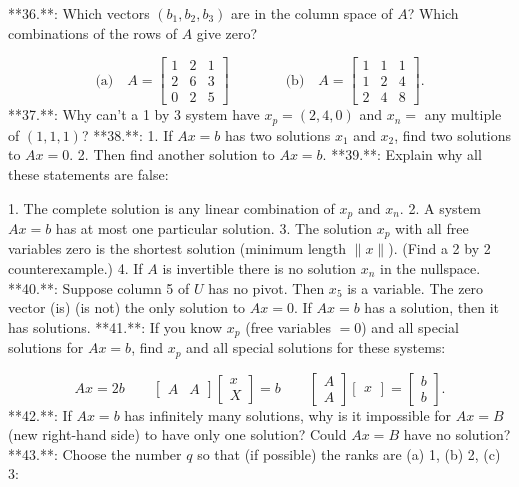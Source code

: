 

**36.**: Which vectors \((b_{1},b_{2},b_{3})\) are in the column space of \(A\)? Which combinations of the rows of \(A\) give zero?

\[\text{(a)}\quad A=\begin{bmatrix}1&2&1\\ 2&6&3\\ 0&2&5\end{bmatrix}\qquad\qquad\text{(b)}\quad A=\begin{bmatrix}1&1&1\\ 1&2&4\\ 2&4&8\end{bmatrix}.\]
**37.**: Why can't a 1 by 3 system have \(x_{p}=(2,4,0)\) and \(x_{n}=\) any multiple of \((1,1,1)\)?
**38.**: 1. If \(Ax=b\) has two solutions \(x_{1}\) and \(x_{2}\), find two solutions to \(Ax=0\). 2. Then find another solution to \(Ax=b\).
**39.**: Explain why all these statements are false:

1. The complete solution is any linear combination of \(x_{p}\) and \(x_{n}\). 2. A system \(Ax=b\) has at most one particular solution. 3. The solution \(x_{p}\) with all free variables zero is the shortest solution (minimum length \(\|x\|\)). (Find a 2 by 2 counterexample.) 4. If \(A\) is invertible there is no solution \(x_{n}\) in the nullspace.
**40.**: Suppose column 5 of \(U\) has no pivot. Then \(x_{5}\) is a variable. The zero vector (is) (is not) the only solution to \(Ax=0\). If \(Ax=b\) has a solution, then it has solutions.
**41.**: If you know \(x_{p}\) (free variables \(=0\)) and all special solutions for \(Ax=b\), find \(x_{p}\) and all special solutions for these systems:

\[Ax=2b\qquad\begin{bmatrix}A&A\end{bmatrix}\begin{bmatrix}x\\ X\end{bmatrix}=b\qquad\begin{bmatrix}A\\ A\end{bmatrix}\begin{bmatrix}x\end{bmatrix}=\begin{bmatrix}b\\ b\end{bmatrix}.\]
**42.**: If \(Ax=b\) has infinitely many solutions, why is it impossible for \(Ax=B\) (new right-hand side) to have only one solution? Could \(Ax=B\) have no solution?
**43.**: Choose the number \(q\) so that (if possible) the ranks are (a) 1, (b) 2, (c) 3:

